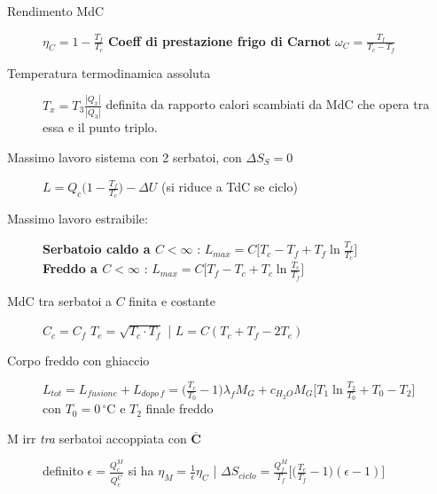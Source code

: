 \documentclass[10pt, oneside]{article}
\begin{document}
\begin{description}
\item[Rendimento MdC] $\boxed{\displaystyle \eta_C = 1 - \frac{T_f}{T_c}}$ \hfill \textbf{Coeff di prestazione frigo di Carnot} $\boxed{\displaystyle \omega_C = \frac{T_f}{T_c - T_f}}$
\item[Temperatura termodinamica assoluta] $\displaystyle T_x = T_3 \frac{|Q_x|}{|Q_3|}$ definita da rapporto calori scambiati da MdC che opera tra essa e il punto triplo.
\item[Massimo lavoro sistema con 2 serbatoi, con $\Delta S_S = 0$] $\displaystyle L = Q_c \bigg(1 - \frac{T_f}{T_c}\bigg) - \Delta U$ \hfill (si riduce a TdC se ciclo)
\item[Massimo lavoro estraibile:] \textbf{Serbatoio caldo a $C < \infty$} : $\displaystyle L_{max} = C\bigg[T_c - T_f + T_f \ln \frac{T_f}{T_c}\bigg]$ \\ \textbf{Freddo a $C < \infty$} : $\displaystyle L_{max} = C \bigg[T_f - T_c + T_c \ln \frac{T_c}{T_f}\bigg]$
\item[MdC tra serbatoi a $C$ finita e costante] $\displaystyle C_c = C_f$ \hfill \big\rangle \hfill $\displaystyle T_e = \sqrt{T_c \cdot T_f}$ \hfill \big| \hfill $\displaystyle L = C (T_c + T_f - 2 T_e)$
\item[Corpo freddo con ghiaccio] $\displaystyle L_{tot} = L_{fusione} + L_{dopo \, f} = \bigg(\frac{T_c}{T_0} - 1\bigg) \lambda_f M_G + c_{H_2O} M_G \bigg[T_1 \ln \frac{T_2}{T_0} + T_0 - T_2\bigg]$ \\con $T_0 = 0 \, \mathrm{{}^\circ C}$ e $T_2$ finale freddo
\item[M irr \textit{tra} serbatoi accoppiata con $\mathbf{\overline{C}}$] definito $\displaystyle \epsilon = \frac{\displaystyle Q_c^M}{\displaystyle Q_c^{\overline{C}}}$ si ha $\displaystyle \eta_M = \frac{1}{\epsilon} \eta_C$ \hfill \big| \hfill $\displaystyle \Delta S_{ciclo} = \frac{Q_f^M}{T_f} \bigg[\bigg(\frac{T_c}{T_f} - 1\bigg)(\epsilon - 1)\bigg]$
\end{description}
\end{document}
